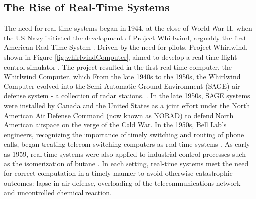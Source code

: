 \subsection{The Rise of Real-Time Systems}


The need for real-time systems began in 1944, at the close of World War II, when the US Navy initiated the development of Project Whirlwind, arguably the first American Real-Time System \cite{laplante_historical_1995}.
Driven by the need for pilots, Project Whirlwind, shown in Figure \ref{fig:whirlwindComputer}, aimed to develop a real-time flight control simulator \cite{forrester_whirlwind_1990}.
The project resulted in the first real-time computer, the Whirlwind Computer, which 
From the late 1940s to the 1950s, the Whirlwind Computer evolved into the Semi-Automatic Ground Environment (SAGE) air-defense system - a collection of radar stations. \cite{noauthor_tales_nodate}.
In the late 1950s, SAGE systems were installed by Canada and the United States as a joint effort under the North American Air Defense Command (now known as NORAD) to defend North American airspace on the verge of the Cold War\cite{north_american_aerospace_defense_command_brief_nodate}.
In the 1950s, Bell Lab's engineers, recognizing the importance of timely switching and routing of phone calls, began treating telecom switching computers as real-time systems \cite{joel_communication_1957}.
As early as 1959, real-time systems were also applied to industrial control processes such as the isomerization of butane \cite{harrison_evolution_1981-1,stout_computer_1959}.
In each setting, real-time systems meet the need for correct computation in a timely manner to avoid otherwise catastrophic outcomes: lapse in air-defense, overloading of the telecommunications network and uncontrolled chemical reaction.


